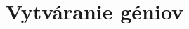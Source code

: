 \documentclass[11pt,a4paper%
]{article}
\begin{document}
\section{Vytváranie géniov}
%
%
%
\end{document}
